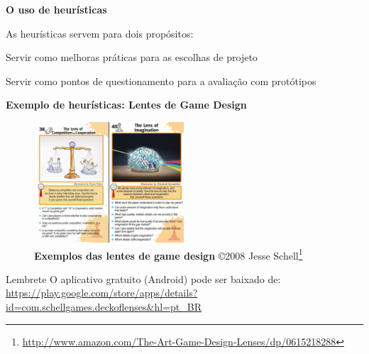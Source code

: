 \expandafter\documentclass\expandafter[table, usenames, svgnames, dvipsnames, \classopts]{beamer}
\begin{document}
\begin{frame}{\textbf{O uso de heurísticas}}

	As heurísticas servem para dois propósitos:

	\begin{outline}

		\1 Servir como melhoras práticas para as escolhas de projeto

		\vspace{1em}

		\1 Servir como pontos de questionamento para a avaliação com protótipos

	\end{outline}

\end{frame}

\begin{frame}{\textbf{Exemplo de heurísticas: Lentes de Game Design}}

	\begin{figure}
		\includegraphics[draft,height=4.5cm]{game-design-lenses}
		\caption{\tiny\textbf{Exemplos das lentes de game design} \copyright{2008} Jesse Schell\footnote{\url{http://www.amazon.com/The-Art-Game-Design-Lenses/dp/0615218288}}}
	\end{figure}

	\begin{block}{Lembrete}
		\centering
		O aplicativo gratuito (Android) pode ser baixado de:\\
		{\scriptsize \url{https://play.google.com/store/apps/details?id=com.schellgames.deckoflenses&hl=pt_BR}}
	\end{block}

	\vspace{1em}

\end{frame}
\end{document}
